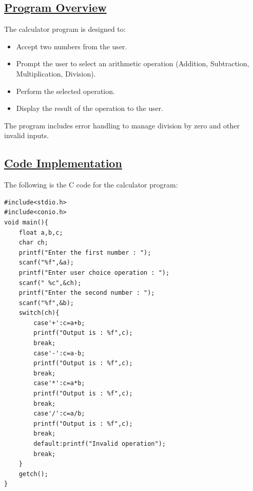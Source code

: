 \documentclass{article}
\begin{document}
\subsection{\underline{Program Overview}}
The calculator program is designed to:
\begin{itemize}
    \item Accept two numbers from the user.
    \item Prompt the user to select an arithmetic operation (Addition, Subtraction, Multiplication, Division).
    \item Perform the selected operation.
    \item Display the result of the operation to the user.
\end{itemize}

The program includes error handling to manage division by zero and other invalid inputs.

\subsection{\underline{Code Implementation}}
The following is the C code for the calculator program:

\newpage
{}

\begin{verbatim}
#include<stdio.h>
#include<conio.h>
void main(){
    float a,b,c;
    char ch;
    printf("Enter the first number : ");
    scanf("%f",&a);
    printf("Enter user choice operation : ");
    scanf(" %c",&ch);
    printf("Enter the second number : ");
    scanf("%f",&b);
    switch(ch){
        case'+':c=a+b;
        printf("Output is : %f",c);
        break;
        case'-':c=a-b;
        printf("Output is : %f",c);
        break;
        case'*':c=a*b;
        printf("Output is : %f",c);
        break;
        case'/':c=a/b;
        printf("Output is : %f",c);
        break;
        default:printf("Invalid operation");
        break;
    }
    getch();
}
\end{verbatim}
\end{document}
